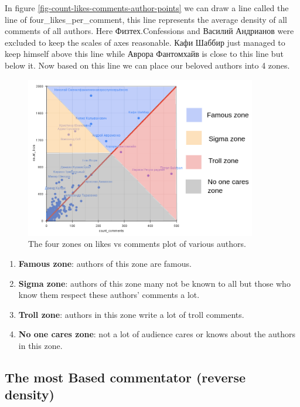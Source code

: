 \documentclass[
	12pt
] {article}
\begin{document}
	In figure \ref{fig-count-likes-comments-author-points} we can draw a line called the line of four\_likes\_per\_comment, this line represents the average density of all comments of all authors. Here Физтех.Confessions and Василий Андрианов were excluded to keep the scales of axes reasonable. Кафи Шаббир just managed to keep himself above this line while Аврора Фантомхайв is close to this line but below it. Now based on this line we can place our beloved authors into 4 zones.

	\begin{figure}[H]
		\centering
		\includegraphics[width=0.9\textwidth]{fig-likes-vs-comments-divided-into-zones}
		\caption{The four zones on likes vs comments plot of various authors.}
		\label{fig-likes-vs-comments-divided-into-zones}
	\end{figure}

	\begin{enumerate}
		\item \textbf{Famous zone}: authors of this zone are famous.
		\item \textbf{Sigma zone}: authors of this zone many not be known to all but those who know them respect these authors' comments a lot.
		\item \textbf{Troll zone}: authors in this zone write a lot of troll comments.
		\item \textbf{No one cares zone}: not a lot of audience cares or knows about the authors in this zone.
	\end{enumerate}

\subsection{The most Based commentator (reverse density)}
\end{document}
